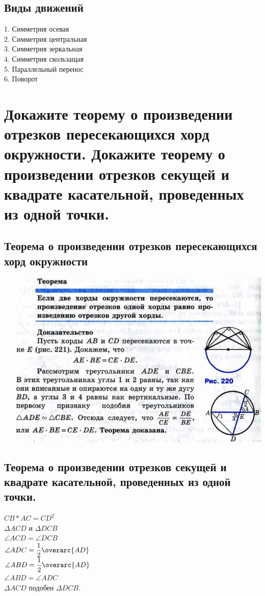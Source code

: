 \documentclass[12pt, letterpaper]{article}
\begin{document}
\subsection{Виды движений}
1. Симметрия осевая \\
2. Симметрия центральная \\
3. Симметрия зеркальная \\
4. Симметрия скользащая \\
5. Параллельный перенос \\
6. Поворот \\




\section {Докажите теорему о произведении отрезков пересекающихся хорд окружности. Докажите теорему о произведении отрезков секущей и квадрате касательной, проведенных из одной точки.}

\subsection{Теорема о произведении отрезков пересекающихся хорд окружности}
\includegraphics[scale=0.3]{photo10.jpg}
\subsection{Теорема о произведении отрезков секущей и квадрате касательной, проведенных из одной точки.}
\textbf{$CB*AC=CD^2$ \\}
$\Delta ACD $ и $ \Delta DCB $ \\
$ \angle ACD = \angle DCB $ \\ 
$ \angle ADC  = \dfrac{1}{2} \overarc{AD} $ \\
$ \angle ABD  = \dfrac{1}{2} \overarc{AD} $ \\
$ \angle ABD  = \angle ADC $ \\
$ \Delta ACD $ подобен $ \Delta DCB $. \\
\end{document}
